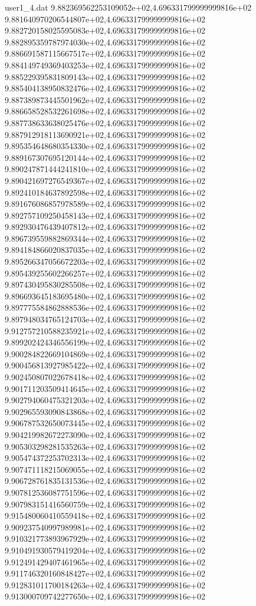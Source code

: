 \begin{filecontents}{user1_4.dat}
9.882369562253109052e+02,4.696331799999999816e+02
9.881640970206544807e+02,4.696331799999999816e+02
9.882720158025595083e+02,4.696331799999999816e+02
9.882895359787974030e+02,4.696331799999999816e+02
9.886691587115667517e+02,4.696331799999999816e+02
9.884149749369403253e+02,4.696331799999999816e+02
9.885229395831809143e+02,4.696331799999999816e+02
9.885404138950832476e+02,4.696331799999999816e+02
9.887389873445501962e+02,4.696331799999999816e+02
9.886658528532261698e+02,4.696331799999999816e+02
9.887738633638025476e+02,4.696331799999999816e+02
9.887912918113690921e+02,4.696331799999999816e+02
9.895354648680354330e+02,4.696331799999999816e+02
9.889167307695120144e+02,4.696331799999999816e+02
9.890247871444241810e+02,4.696331799999999816e+02
9.890421697276549367e+02,4.696331799999999816e+02
9.892410184637892598e+02,4.696331799999999816e+02
9.891676086857978589e+02,4.696331799999999816e+02
9.892757109250458143e+02,4.696331799999999816e+02
9.892930476439407812e+02,4.696331799999999816e+02
9.896739559882869344e+02,4.696331799999999816e+02
9.894184866020837035e+02,4.696331799999999816e+02
9.895266347056672203e+02,4.696331799999999816e+02
9.895439255602266257e+02,4.696331799999999816e+02
9.897430495830285508e+02,4.696331799999999816e+02
9.896693645183695480e+02,4.696331799999999816e+02
9.897775584862888536e+02,4.696331799999999816e+02
9.897948034765124703e+02,4.696331799999999816e+02
9.912757210588235921e+02,4.696331799999999816e+02
9.899202424346556199e+02,4.696331799999999816e+02
9.900284822669104869e+02,4.696331799999999816e+02
9.900456813927985422e+02,4.696331799999999816e+02
9.902450807022678418e+02,4.696331799999999816e+02
9.901711203509414645e+02,4.696331799999999816e+02
9.902794060475321203e+02,4.696331799999999816e+02
9.902965593090843868e+02,4.696331799999999816e+02
9.906787532650073445e+02,4.696331799999999816e+02
9.904219982672273090e+02,4.696331799999999816e+02
9.905303298281535263e+02,4.696331799999999816e+02
9.905474372253702313e+02,4.696331799999999816e+02
9.907471118215069055e+02,4.696331799999999816e+02
9.906728761835131536e+02,4.696331799999999816e+02
9.907812536087751596e+02,4.696331799999999816e+02
9.907983151416560759e+02,4.696331799999999816e+02
9.915480060410559418e+02,4.696331799999999816e+02
9.909237540997989981e+02,4.696331799999999816e+02
9.910321773893967929e+02,4.696331799999999816e+02
9.910491930579419204e+02,4.696331799999999816e+02
9.912491429407461965e+02,4.696331799999999816e+02
9.911746320160848427e+02,4.696331799999999816e+02
9.912831011700184263e+02,4.696331799999999816e+02
9.913000709742277650e+02,4.696331799999999816e+02

\end{filecontents}
